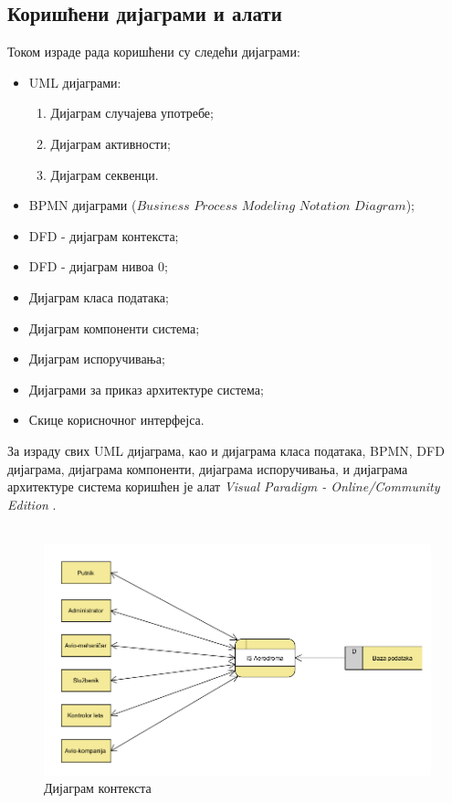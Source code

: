 \documentclass{article}
\begin{document}
\subsection{Коришћени дијаграми и алати}
Током израде рада коришћени су следећи дијаграми:
\begin{itemize}
    \item UML дијаграми:
        \begin{enumerate}
            \item Дијаграм случајева употребе;
            \item Дијаграм активности;
            \item Дијаграм секвенци.
        \end{enumerate}
    \item BPMN дијаграми ($Business$ $Process$ $Modeling$ $Notation$ $Diagram$);
    \item DFD - дијаграм контекста;
    \item DFD - дијаграм нивоа 0;
    \item Дијаграм класа података;
    \item Дијаграм компоненти система;
    \item Дијаграм испоручивања;
    \item Дијаграми за приказ архитектуре система;
    \item Скице корисночног интерфејса.
\end{itemize}

За израду свих UML дијаграма, као 
и дијаграма класа података, BPMN, DFD дијаграма, дијаграма компоненти, дијаграма испоручивања, и дијаграма архитектуре система коришћен је алат \textit{Visual Paradigm - Online/Community Edition} \cite{vp}.\\\\

\begin{figure}[H]
    \begin{center}
        \includegraphics[width=1.1\textwidth]{Dijagrami_slike/dijagram_konteksta.png}
        \caption{Дијаграм контекста}
    \end{center}
\end{figure}
\end{document}
